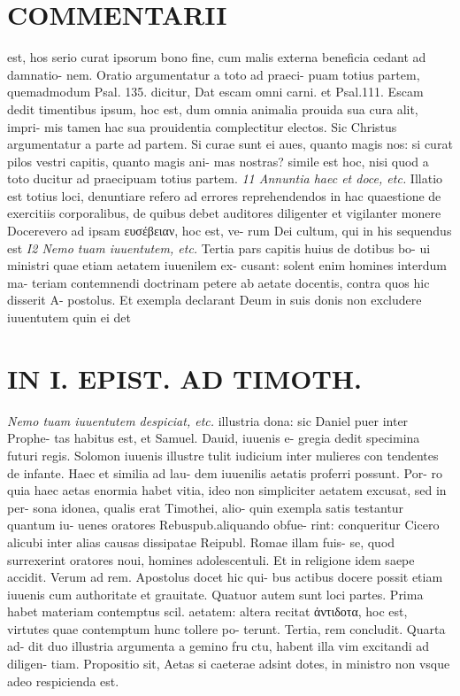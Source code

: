 \documentclass{article}
\begin{document}
\begin{pages}
\section*{COMMENTARII }
\marginpar{[ p.104 ]}\pstart est, hos serio curat ipsorum bono fine, cum malis externa beneficia cedant ad damnatio- nem. Oratio argumentatur a toto ad praeci- puam totius partem, quemadmodum Psal. 135. dicitur, Dat escam omni carni. et Psal.111. Escam dedit timentibus ipsum, hoc est, dum omnia animalia prouida sua cura alit, impri- mis tamen hac sua prouidentia complectitur electos. Sic Christus argumentatur a parte ad partem. Si curae sunt ei aues, quanto magis nos: si curat pilos vestri capitis, quanto magis ani- mas nostras? simile est hoc, nisi quod a toto ducitur ad praecipuam totius partem.  \pend
\textit{11 Annuntia haec et doce, etc. }\pstart Illatio est totius loci, denuntiare refero ad errores reprehendendos in hac quaestione de exercitiis corporalibus, de quibus debet auditores diligenter et vigilanter monere  \pend\pstart Docerevero ad ipsam ευσέβειαν, hoc est, ve- rum Dei cultum, qui in his sequendus est  \pend
\textit{I2 Nemo tuam iuuentutem, etc. }\pstart Tertia pars capitis huius de dotibus bo- ui ministri quae etiam aetatem iuuenilem ex- cusant: solent enim homines interdum ma- teriam contemnendi doctrinam petere ab aetate docentis, contra quos hic disserit A- postolus. Et exempla declarant Deum in suis donis non excludere iuuentutem quin ei det  \pend
\section*{IN I. EPIST. AD TIMOTH. }
\marginpar{[ p.105 ]}
\textit{Nemo tuam iuuentutem despiciat, etc. }\pstart illustria dona: sic Daniel puer inter Prophe- tas habitus est, et Samuel. Dauid, iuuenis e- gregia dedit specimina futuri regis. Solomon iuuenis illustre tulit iudicium inter mulieres con tendentes de infante. Haec et similia ad lau- dem iuuenilis aetatis proferri possunt. Por- ro quia haec aetas enormia habet vitia, ideo non simpliciter aetatem excusat, sed in per- sona idonea, qualis erat Timothei, alio- quin exempla satis testantur quantum iu- uenes oratores Rebuspub.aliquando obfue- rint: conqueritur Cicero alicubi inter alias causas dissipatae Reipubl. Romae illam fuis- se, quod surrexerint oratores noui, homines adolescentuli. Et in religione idem saepe accidit.  \pend\pstart Verum ad rem. Apostolus docet hic qui- bus actibus docere possit etiam iuuenis cum authoritate et grauitate. Quatuor autem sunt loci partes. Prima habet materiam contemptus scil. aetatem: altera recitat ἀντιδοτα, hoc est, virtutes quae contemptum hunc tollere po- terunt. Tertia, rem concludit. Quarta ad- dit duo illustria argumenta a gemino fru ctu, habent illa vim excitandi ad diligen- tiam.  \pend\pstart Propositio sit, Aetas si caeterae adsint dotes, in ministro non vsque adeo respicienda est.  \pend

\end{pages}
\end{document}
